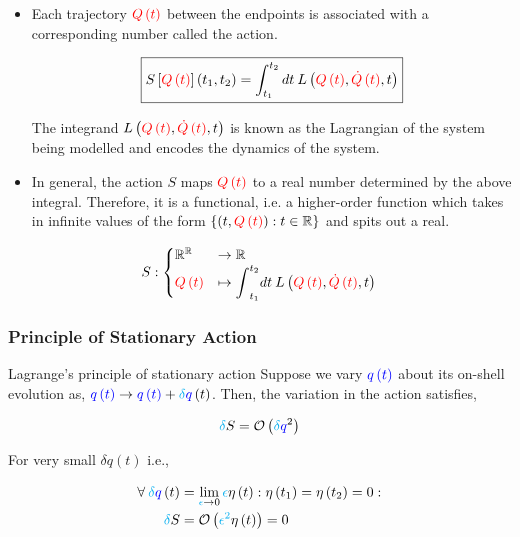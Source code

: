 \documentclass{beamer}
\begin{document}
\begin{frame}
\begin{itemize}
\item Each trajectory $\textcolor{red}{Q \left( t \right)}$ between the endpoints is associated with a corresponding number called the action.

$$\boxed{S \left[ \textcolor{red}{Q \left( t \right)} \right] \left( t_1, t_2 \right) = \int_{t_1}^{t_2} dt \: L \left( \textcolor{red}{Q \left( t \right)}, \textcolor{red}{\dot{Q} \left( t \right)}, t \right)}$$

The integrand $L \left( \textcolor{red}{Q \left( t \right)}, \textcolor{red}{\dot{Q} \left( t \right)}, t \right)$ is known as the Lagrangian of the system being modelled and encodes the dynamics of the system.

\item In general, the action $S$ maps $\textcolor{red}{Q \left( t \right)}$ to a real number determined by the above integral. Therefore, it is a functional, i.e. a higher-order function which takes in infinite values of the form $\left\{ \left( t, \textcolor{red}{Q \left( t \right)} \right) : t \in \mathbb{R} \right\}$ and spits out a real.
\end{itemize}

$$
S : \begin{cases} \mathbb{R}^\mathbb{R} & \to \mathbb{R} \\ \textcolor{red}{Q \left( t \right)} & \mapsto \displaystyle{\int}_{t_1}^{t_2} dt \: L \left( \textcolor{red}{Q \left( t \right)}, \textcolor{red}{\dot{Q} \left( t \right)}, t \right) \end{cases}
$$
\end{frame}

\begin{frame}
\frametitle{Principle of Stationary Action}

\begin{block}{Lagrange's principle of stationary action}
Suppose we vary $\textcolor{blue}{q \left( t \right)}$ about its on-shell evolution as, $\textcolor{blue}{q \left( t \right)} \to \textcolor{blue}{q \left( t \right)} + \textcolor{cyan}{\delta} \textcolor{blue}{q} \left( t \right)$. Then, the variation in the action satisfies,

$$\textcolor{cyan}{\delta} S = \mathcal{O} \left( \textcolor{cyan}{\delta} \textcolor{blue}{q}^2  \right)$$
\end{block}

\begin{corollary}
For very small $\delta q \left( t \right)$ i.e.,

\begin{align*}
\forall \: \textcolor{cyan}{\delta} \textcolor{blue}{q} \left( t \right) & = \lim_{\textcolor{cyan}{\epsilon} \to 0} \textcolor{cyan}{\epsilon} \eta \left( t \right) : \eta \left( t_1 \right) = \eta \left( t_2 \right) = 0 : \\
\textcolor{cyan}{\delta} S & = \mathcal{O} \left( \textcolor{cyan}{\epsilon^2} \eta \left( t \right) \right) = 0
\end{align*}
\end{corollary}
\end{frame}
\end{document}
